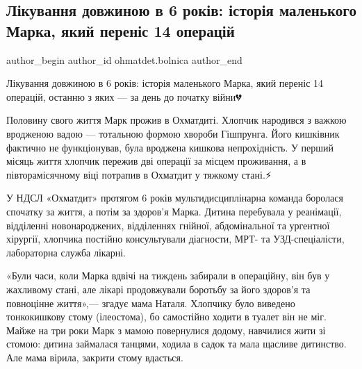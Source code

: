  
 
 
 
 
 
\subsection{Лікування довжиною в 6 років: історія маленького Марка, який переніс 14 операцій}
\label{sec:16_11_2022.fb.ohmatdet.bolnica.1.mark_6_rokiv}
 
\ifcmt
 author_begin
   author_id ohmatdet.bolnica
 author_end
\fi

Лікування довжиною в 6 років: історія маленького Марка, який переніс 14
операцій, останню з яких — за день до початку війни💔

Половину свого життя Марк прожив в Охматдиті. Хлопчик народився з важкою
вродженою вадою — тотальною формою хвороби Гішпрунга. Його кишківник фактично
не функціонував, була вроджена кишкова непрохідність. У перший місяць життя
хлопчик пережив дві операції за місцем проживання, а в півторамісячному віці
потрапив в Охматдит у тяжкому стані.⚡️

У НДСЛ «Охматдит» протягом 6 років мультидисциплінарна команда боролася
спочатку за життя, а потім за здоров’я Марка. Дитина перебувала у реанімації,
відділенні новонароджених, відділеннях гнійної, абдомінальної та ургентної
хірургії, хлопчика постійно консультували діагности, МРТ- та УЗД-спеціалісти,
лабораторна служба лікарні.💪🏻

«Були часи, коли Марка вдвічі на тиждень забирали в операційну, він був у
жахливому стані, але лікарі продовжували боротьбу за його здоров’я та
повноцінне життя»,— згадує мама Наталя. Хлопчику було виведено тонкокишкову
стому (ілеостома), бо самостійно ходити в туалет він не міг. Майже на три роки
Марк з мамою повернулися додому, навчилися жити зі стомою: дитина займалася
танцями, ходила в садок та мала щасливе дитинство. Але мама вірила, закрити
стому вдасться.🙏🏻


